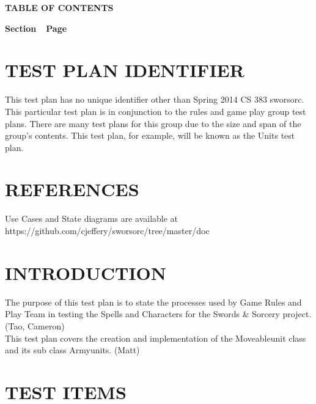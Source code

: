 {\centering{}\bfseries\color{black}
TABLE OF CONTENTS
\par}

{\bfseries\color{black}
Section\ \ Page}

\setcounter{tocdepth}{9}
\renewcommand\contentsname{}
\tableofcontents

\setcounter{page}{1}\pagestyle{Convertiv}

\section[IDENTIFIER]{\bfseries\color{black} TEST PLAN IDENTIFIER}

{\color{black}
This test plan has no unique identifier other than Spring 2014 CS 383 sworsorc. This particular test plan is in conjunction to the rules and game play group test plans. There are many test plans for this group due to the size and span of the group's contents. This test plan, for example, will be known as the Units test plan.}

\section[REFERENCES]{\bfseries\color{black}
REFERENCES}

{\color{black}
Use Cases and State diagrams are available at https://github.com/cjeffery/sworsorc/tree/master/doc }


\section[INTRODUCTION]{\bfseries\color{black} INTRODUCTION}

{\color{black}
The purpose of this test plan is to state the processes used by Game Rules and Play Team in testing the Spells and Characters for the Swords \& Sorcery project.(Tao, Cameron)
\\
This test plan covers the creation and implementation of the Moveableunit class and its sub class Armyunits. (Matt)


}

\section[TEST ITEMS]{\bfseries\color{black} TEST ITEMS}


